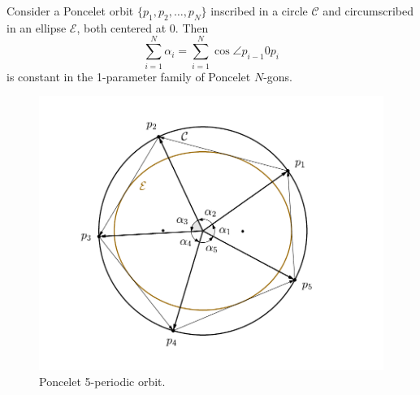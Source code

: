 \begin{theorem}
Consider a Poncelet orbit $\{p_1,p_2,\ldots, p_N\}$ inscribed in a circle $\mathcal{C}$ and circumscribed in an ellipse $
\mathcal{E}$, both centered at $0.$
Then 
\[\sum_{i=1}^N\alpha_i= \sum_{i=1}^N \cos\angle p_{i-1}0p_{i}\] is constant in the 1-parameter family of Poncelet $N$-gons.
\label{th:somacossenos_liouville}
\end{theorem}
\begin{figure}
    \centering
    \includegraphics[scale=0.8]{pics_tex/orbita5_C_E.pdf}
    \caption{Poncelet 5-periodic orbit.}
    \label{fig:orb5_poncelet}
\end{figure}

